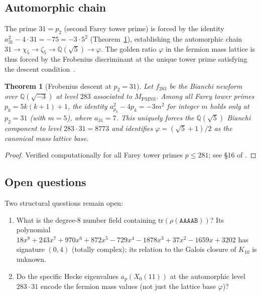 \documentclass[11pt,a4paper]{article}
\newtheorem{theorem}{Theorem}
\theoremstyle{remark}
\newcommand{\MPMNS}{M_{\mathrm{PMNS}}}
\newcommand{\QQ}{\mathbb{Q}}
\newcommand{\Kten}{K_{10}}
\begin{document}
\subsection{Automorphic chain}

The prime $31 = p_2$ (second Farey tower prime) is forced by the
identity $a_{31}^2 - 4 \cdot 31 = -75 = -3 \cdot 5^2$
(Theorem~\ref{thm:p31}), establishing the automorphic chain
$31 \to \chi_5 \to \zeta_5 \to \QQ(\sqrt{5}) \to \varphi$.
The golden ratio $\varphi$ in the fermion mass lattice is thus
forced by the Frobenius discriminant at the unique tower prime
satisfying the descent condition~\cite{Gentry:arith}.

\begin{theorem}[Frobenius descent at $p_2 = 31$]
\label{thm:p31}
Let $f_{283}$ be the Bianchi newform over $\QQ(\sqrt{-3})$ at
level $283$ associated to $\MPMNS$.
Among all Farey tower primes $p_k = 5k(k+1)+1$,
the identity $a_{p_k}^2 - 4p_k = -3m^2$ for integer $m$ holds
\emph{only} at $p_2 = 31$ (with $m = 5$), where $a_{31} = 7$.
This uniquely forces the $\QQ(\sqrt{5})$ Bianchi component to level
$283 \cdot 31 = 8773$ and identifies $\varphi = (\sqrt{5}+1)/2$
as the canonical mass lattice base.
\end{theorem}

\begin{proof}
Verified computationally for all Farey tower primes $p \leq 281$;
see \S16 of \cite{Gentry:arith}.
\end{proof}

\subsection{Open questions}

Two structural questions remain open:
\begin{enumerate}
\item What is the degree-8 number field containing
  $\mathrm{tr}(\rho(\mathtt{AAAAB}))$?
  Its polynomial
  $18x^8 + 243x^7 + 970x^6 + 872x^5 - 729x^4 - 1878x^3 + 37x^2
  - 1659x + 3202$
  has signature $(0,4)$ (totally complex); its relation to the
  Galois closure of $\Kten$ is unknown.
\item Do the specific Hecke eigenvalues $a_p(X_0(11))$ at the
  automorphic level $283 \cdot 31$ encode the fermion mass values
  (not just the lattice base $\varphi$)?
\end{enumerate}

\end{document}
